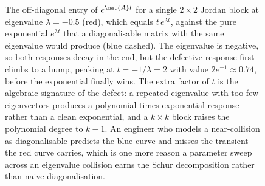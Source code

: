 \begin{figure}[htbp]
\centering
{}
\caption[The defective exponential and its transient hump]{The
off-diagonal entry of $e^{\mat{A}t}$ for a single $2\times2$ Jordan
block at eigenvalue $\lambda = -0.5$ (red), which equals
$t\,e^{\lambda t}$, against the pure exponential $e^{\lambda t}$ that
a diagonalisable matrix with the same eigenvalue would produce (blue
dashed). The eigenvalue is negative, so both responses decay in the
end, but the defective response first climbs to a hump, peaking at
$t = -1/\lambda = 2$ with value $2e^{-1} \approx 0.74$, before the
exponential finally wins. The extra factor of $t$ is the algebraic
signature of the defect: a repeated eigenvalue with too few
eigenvectors produces a polynomial-times-exponential response rather
than a clean exponential, and a $k\times k$ block raises the polynomial
degree to $k-1$. An engineer who models a near-collision as
diagonalisable predicts the blue curve and misses the transient the
red curve carries, which is one more reason a parameter sweep across
an eigenvalue collision earns the Schur decomposition rather than
naive diagonalisation.}
\label{fig:vol02:ch10:jordan-transient}
\end{figure}
